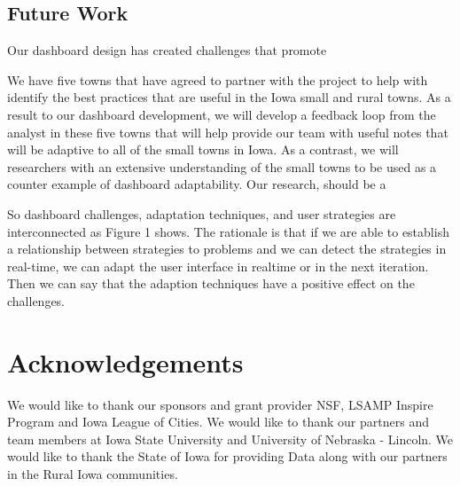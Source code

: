 \documentclass[10pt]{article}\usepackage[]{graphicx}\usepackage[]{color}
\begin{document}
\subsection{Future Work}
Our dashboard design has created challenges that promote 

We have five towns that have agreed to partner with the project to help with identify the best practices that are useful in the Iowa small and rural towns. As a result to our dashboard development, we will develop a feedback loop from the analyst in these five towns that will help provide our team with useful notes that will be adaptive to all of the small towns in Iowa. As a contrast, we will researchers with an extensive understanding of the small towns to be used as a counter example of dashboard adaptability. Our research, should be a 

So dashboard challenges,
adaptation techniques, and user strategies are interconnected as
Figure 1 shows. The rationale is that if we are able to establish
a relationship between strategies to problems and we can detect
the strategies in real-time, we can adapt the user interface in realtime or in the next iteration. Then we can say that the adaption
techniques have a positive effect on the challenges.
\section{Acknowledgements}
We would like to thank our sponsors and grant provider NSF, LSAMP Inspire Program and Iowa League of Cities. We would like to thank our partners and team members at Iowa State University and University of Nebraska - Lincoln. We would like to thank the State of Iowa for providing Data along with our partners in the Rural Iowa communities.



\end{document}
